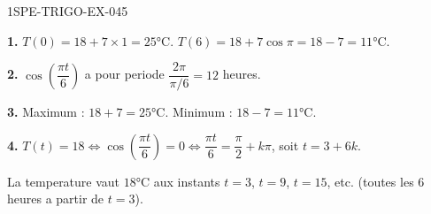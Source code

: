 \begin{corrige}{1SPE-TRIGO-EX-045}

\textbf{1.} $T(0) = 18 + 7 \times 1 = 25°$C. $T(6) = 18 + 7\cos\pi = 18 - 7 = 11°$C.

\textbf{2.} $\cos\!\left(\dfrac{\pi t}{6}\right)$ a pour periode $\dfrac{2\pi}{\pi/6} = 12$ heures.

\textbf{3.} Maximum : $18 + 7 = 25°$C. Minimum : $18 - 7 = 11°$C.

\textbf{4.} $T(t) = 18 \iff \cos\!\left(\dfrac{\pi t}{6}\right) = 0 \iff \dfrac{\pi t}{6} = \dfrac{\pi}{2} + k\pi$, soit $t = 3 + 6k$.

La temperature vaut $18°$C aux instants $t = 3$, $t = 9$, $t = 15$, etc. (toutes les $6$ heures a partir de $t = 3$).

\end{corrige}
